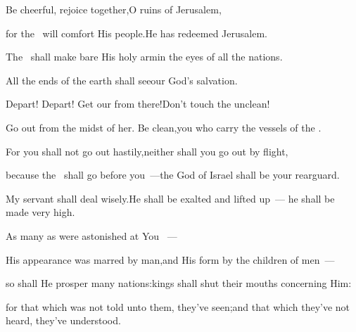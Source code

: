 \begin{inparaenum}
  \pa {} Be cheerful, rejoice together,\pa O ruins of Jerusalem,%
  
  \pb for the \lord\ will comfort His people.\pa He has redeemed Jerusalem.%
  
  \pa {} The \lord\ shall make bare His holy arm\pa in the eyes of all the nations.%
  
  \pb All the ends of the earth shall see\pa our God's salvation.\bigskip%
  
  \pb {} Depart! Depart! Get our from there!\pa Don't touch the unclean!%
  
  \pc Go out from the midst of her. Be clean,\pa you who carry the vessels of the \lord.%
  
  \pb {} For you shall not go out hastily,\pa neither shall you go out by flight,%
  
  \pc because the \lord\ shall go before you~---\pa the God of Israel shall be your rearguard.\bigskip%
  
  \pa {} My servant shall deal wisely.\pa He shall be exalted and lifted up~--- he shall be made very high.%
  
  \pa {} As many as were astonished at You%
  ~---%
  
  \pb His appearance was marred by man,\pa and His form by the children of men~---%
  
  \pa {} so shall He prosper many nations:\pa kings shall shut their mouths concerning Him:%
  
  \pb for that which was not told unto them, they've seen;\pa and that which they've not heard, they've understood.%
\end{inparaenum}

